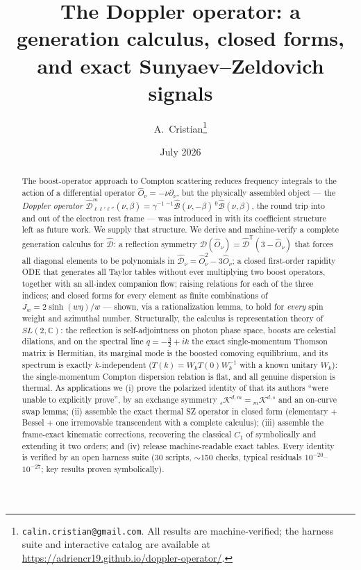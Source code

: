 \documentclass[useAMS,usenatbib]{article}
\title{The Doppler operator: a generation calculus, closed forms,\\ and exact Sunyaev--Zeldovich signals}
\author{A.~Cristian\thanks{\texttt{calin.cristian@gmail.com}. All results are machine-verified; the harness suite
and interactive catalog are available at \url{https://adriencr19.github.io/doppler-operator/}.}}
\date{July 2026}
\newcommand{\Oh}{\hat{O}_\nu}
\newcommand{\Dv}{\hat{\mathcal{D}}_\nu}
\newcommand{\Kk}{\mathcal{K}}
\newcommand{\Bo}{\hat{\mathcal{B}}}
\newcommand{\Do}{\hat{\mathcal{D}}}
\begin{document}
\maketitle

\begin{abstract}
The boost-operator approach to Compton scattering \citep{CR25,CR26,RC26,HLC26} reduces frequency integrals to the
action of a differential operator $\Oh = -\nu\partial_\nu$, but the physically assembled object --- the
\emph{Doppler operator} $\Do^m_{\ell\ell'\ell''}(\nu,\beta) = \gamma^{-1}\,{}^{-1}\Bo(\nu,-\beta)\,{}^{0}\Bo(\nu,\beta)$,
the round trip into and out of the electron rest frame --- was introduced in \citet{RC26} with its coefficient
structure left as future work. We supply that structure. We derive and machine-verify a complete generation
calculus for $\Do$: a reflection symmetry $\Do(\Oh) = \Do^{\mathsf T}(3-\Oh)$ that forces all diagonal elements to
be polynomials in $\Dv = \Oh^2 - 3\Oh$; a closed first-order rapidity ODE that generates all Taylor tables without
ever multiplying two boost operators, together with an all-index companion flow; raising relations for each of the
three indices; and closed forms for every element as finite combinations of $J_w = 2\sinh(w\eta)/w$ --- shown, via
a rationalization lemma, to hold for \emph{every} spin weight and azimuthal number. Structurally, the calculus is
representation theory of $SL(2,\mathbb C)$: the reflection is self-adjointness on photon phase space, boosts are
celestial dilations, and on the spectral line $q=-\tfrac32+ik$ the exact single-momentum Thomson matrix is
Hermitian, its marginal mode is the boosted comoving equilibrium, and its spectrum is exactly $k$-independent
($T(k) = W_kT(0)W_k^{-1}$ with a known unitary $W_k$): the single-momentum Compton dispersion relation is flat,
and all genuine dispersion is thermal. As applications we (i) prove the polarized identity of
\citet[Eq.~20]{RC26} that its authors ``were unable to explicitly prove'', by an exchange symmetry
${}_s\Kk^{d,m} = {}_m\Kk^{d,s}$ and an on-curve swap lemma; (ii) assemble the exact thermal SZ operator in closed
form (elementary + Bessel + one irremovable transcendent with a complete calculus); (iii) assemble the frame-exact
kinematic corrections, recovering the classical $C_1$ of \citet{Nozawa1998} symbolically and extending it two
orders; and (iv) release machine-readable exact tables. Every identity is verified by an open harness suite
(30 scripts, $\sim$150 checks, typical residuals $10^{-20}$--$10^{-27}$; key results proven symbolically).
\end{abstract}
\end{document}
